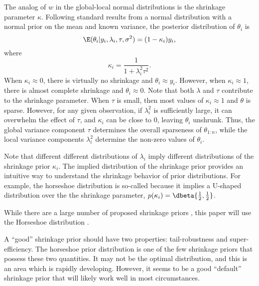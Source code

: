 The analog of $w$ in the global-local normal distributions is the shrinkage parameter $\kappa$.
Following standard results from a normal distribution with a normal prior on the mean and known variance, the posterior distribution of $\theta_{i}$ is
\begin{equation}
  \label{dlm:eq:11}
  \E ( \theta_{i} | y_{i}, \lambda_{i}, \tau, \sigma^{2} )  = (1 - \kappa_{i}) y_{i} \text{,}
\end{equation}
where
\begin{equation}
  \label{dlm:eq:19}
  \kappa_{i} = \frac{1}{1 + \lambda^{2}_{i} \tau^{2}} \text{.}
\end{equation}
When $\kappa_{i} \approx 0$, there is virtually no shrinkage and $\theta_{i} \approx y_{i}$.
However, when $\kappa_{i} \approx 1$, there is almost complete shrinkage and $\theta_{i} \approx 0$.
Note that both $\lambda$ and $\tau$ contribute to the shrinkage parameter.
When $\tau$ is small, then most values of $\kappa_{i} \approx 1$ and $\theta$ is sparse.
However, for any given observation, if $\lambda_{i}^{2}$ is sufficiently large, it can overwhelm the effect of $\tau$, and $\kappa_{i}$ can be close to 0, leaving $\theta_{i}$ unshrunk.
Thus, the global variance component $\tau$ determines the overall sparseness of $\theta_{1:n}$, while the local variance components $\lambda_{i}^{2}$ determine the non-zero values of $\theta_{i}$.

Note that different different distributions of $\lambda_{i}$ imply different distributions of the shrinkage prior $\kappa_{i}$.
The implied distribution of the shrinkage prior provides an intuitive way to understand the shrinkage behavior of prior distributions.
For example, the horseshoe distribution is so-called because it implies a U-shaped distribution over the the shrinkage parameter, $p(\kappa_{i}) = \dbeta{\frac{1}{2}, \frac{1}{2}}$.

While there are a large number of proposed shrinkage priors \parencites{ArmaganDunsonLee2011}{BrownGriffin2010}{PolsonScott2010}, this paper will use the Horseshoe distribution \parencites{CarvalhoPolsonScott2009}{CarvalhoPolsonScott2010}{PolsonScott2010}{PolsonScott2012}{DattaGhosh2012}.

A ``good'' shrinkage prior should have two properties: tail-robustness and super-efficiency.
The horseshoe prior distribution is one of the few shrinkage priors that possess these two quantities.
It may not be the optimal distribution, and this is an area which is rapidly developing.
However, it seems to be a good ``default'' shrinkage prior that will likely work well in most circumstances.

